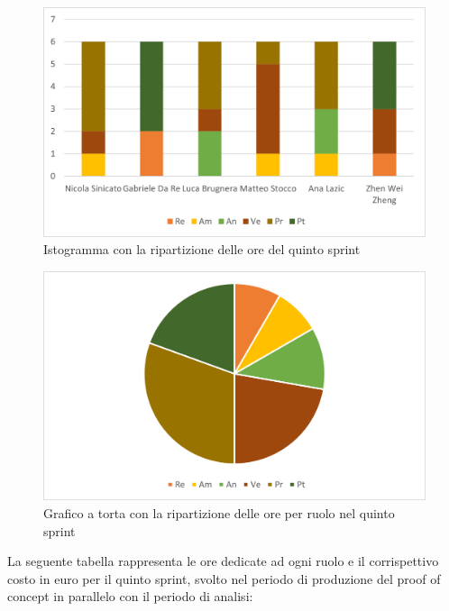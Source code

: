 \begin{figure}[H]
    \centering
    \includegraphics[scale=0.6]{img/grafi preventivo/istogrammi/proof/periodo2.png}
    \caption{Istogramma con la ripartizione delle ore del quinto sprint}
\end{figure}
\begin{figure}[H]
    \centering
    \includegraphics[scale=0.6]{img/grafi preventivo/torta/proof/periodo2.png}
    \caption{Grafico a torta con la ripartizione delle ore per ruolo nel quinto sprint}
\end{figure}
La seguente tabella rappresenta le ore dedicate ad ogni ruolo e il corrispettivo costo in euro per il quinto sprint, svolto nel periodo di produzione del proof of concept in parallelo con il periodo di analisi:


